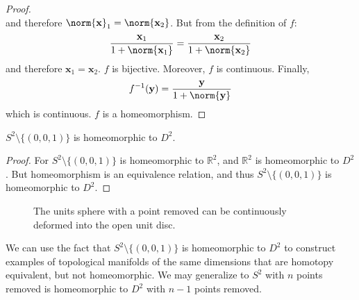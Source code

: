\documentclass[crop=false,class=book,oneside]{standalone}                      %
\begin{document}
\begin{proof}
\begin{equation}
                \end{equation}
                and therefore
                $\norm{\mathbf{x}}_{1}=\norm{\mathbf{x}_{2}}$.
                But from the definition of $f$:
                \begin{equation}
                    \frac{\mathbf{x}_{1}}{1+\norm{\mathbf{x}_{1}}}
                    =\frac{\mathbf{x}_{2}}{1+\norm{\mathbf{x}_{2}}}
                \end{equation}
                and therefore $\mathbf{x}_{1}=\mathbf{x}_{2}$.
                $f$ is bijective.
                Moreover, $f$ is continuous. Finally,
                \begin{equation}
                    f^{-1}(\mathbf{y})
                    =\frac{\mathbf{y}}{1+\norm{\mathbf{y}}}                    
                \end{equation}
                which is continuous. $f$ is a homeomorphism.
            \end{proof}
            \begin{theorem}
                $S^{2}\setminus\{(0,0,1)\}$ is homeomorphic to $D^{2}$.
            \end{theorem}
            \begin{proof}
                For $S^{2}\setminus\{(0,0,1)\}$ is homeomorphic to
                $\mathbb{R}^{2}$, and $\mathbb{R}^{2}$ is homeomorphic to
                $D^{2}$. But homeomorphism is an equivalence relation, and
                thus $S^{2}\setminus\{(0,0,1)\}$ is homeomorphic to $D^{2}$.
            \end{proof}
            \begin{figure}[H]
                \centering
                \captionsetup{type=figure}
                
                \caption[Homeomorphism Between $S^{2}\setminus\{(0,0,1)\}$%
                         and $D^{2}$.]
                        {The units sphere with a point removed can be
                         continuously deformed into the open unit disc.}
                \label{fig:homeomorphism_S_2_wo_North_Pole_and_R_2}
            \end{figure}
            We can use the fact that $S^{2}\setminus \{(0,0,1)\}$ is
            homeomorphic to $D^{2}$ to construct examples of topological
            manifolds of the same dimensions that are homotopy equivalent, but
            not homeomorphic. We may generalize to $S^{2}$ with $n$ points
            removed is homeomorphic to $D^{2}$ with $n-1$ points removed.
\end{document}
